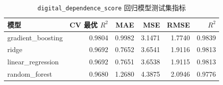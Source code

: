 \begin{table}[H]
\centering
\caption{\texttt{digital\_dependence\_score} 回归模型测试集指标}
\label{tab:regression-digital-dependence-metrics}
\begin{tabular}{lrrrrr}
\toprule
模型 & CV 最优 $R^2$ & MAE & MSE & RMSE & $R^2$ \\
\midrule
gradient\_boosting & 0.9804 & 0.9982 & 3.1471 & 1.7740 & 0.9839 \\
ridge & 0.9692 & 0.7652 & 3.6541 & 1.9116 & 0.9813 \\
linear\_regression & 0.9692 & 0.7651 & 3.6538 & 1.9115 & 0.9813 \\
random\_forest & 0.9680 & 1.2680 & 4.3875 & 2.0946 & 0.9776 \\
\bottomrule
\end{tabular}
\end{table}
